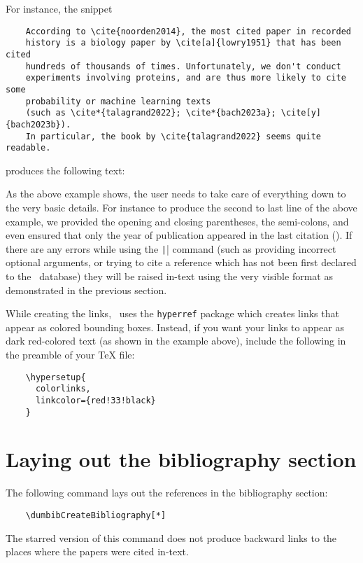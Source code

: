 \documentclass[letter, 12pt]{article}
\begin{document}
  For instance, the snippet
  \begin{verbatim}
    According to \cite{noorden2014}, the most cited paper in recorded
    history is a biology paper by \cite[a]{lowry1951} that has been cited
    hundreds of thousands of times. Unfortunately, we don't conduct
    experiments involving proteins, and are thus more likely to cite some
    probability or machine learning texts
    (such as \cite*{talagrand2022}; \cite*{bach2023a}; \cite[y]{bach2023b}).
    In particular, the book by \cite{talagrand2022} seems quite readable.
  \end{verbatim}
  produces the following text:

  \begin{center}
  \end{center}
  
  As the above example shows, the user needs to take care of everything down to the very basic details. For instance to produce the second to last line of the above example, we provided the opening and closing parentheses, the semi-colons, and even ensured that only the year of publication appeared in the last citation (\cite*{bach2023b}). If there are any errors while using the \texttt|\cite{}| command (such as providing incorrect optional arguments, or trying to cite a reference which has not been first declared to the \dumbib\ database) they will be raised in-text using the very visible format as demonstrated in the previous section.

  While creating the links, \dumbib\ uses the \texttt{hyperref} package which creates links that appear as colored bounding boxes. Instead, if you want your links to appear as dark red-colored text (as shown in the example above), include the following in the preamble of your \TeX{} file:
  \begin{verbatim}
    \hypersetup{
      colorlinks,
      linkcolor={red!33!black}
    }
  \end{verbatim}

  \section{Laying out the bibliography section}
  The following command lays out the references in the bibliography section:
  \begin{verbatim}
    \dumbibCreateBibliography[*]
  \end{verbatim}
  The starred version of this command does not produce backward links to the places where the papers were cited in-text.
\end{document}
